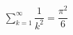 \documentclass[preview]{standalone}
\begin{document}
\begin{align*}
\sum_{k = 1}^{\infty} \dfrac{1}{k^2} = \dfrac{\pi^2}{6}
\end{align*}
\end{document}
